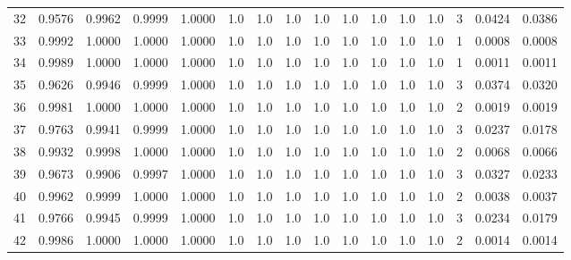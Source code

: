 \begin{tabular}{lrrrrrrrrrrrrrrr}
32  &      0.9576 &  0.9962 &  0.9999 &  1.0000 &     1.0 &     1.0 &     1.0 &     1.0 &     1.0 &     1.0 &      1.0 &        1.0 &      3 &                    0.0424 &                     0.0386 \\
33  &      0.9992 &  1.0000 &  1.0000 &  1.0000 &     1.0 &     1.0 &     1.0 &     1.0 &     1.0 &     1.0 &      1.0 &        1.0 &      1 &                    0.0008 &                     0.0008 \\
34  &      0.9989 &  1.0000 &  1.0000 &  1.0000 &     1.0 &     1.0 &     1.0 &     1.0 &     1.0 &     1.0 &      1.0 &        1.0 &      1 &                    0.0011 &                     0.0011 \\
35  &      0.9626 &  0.9946 &  0.9999 &  1.0000 &     1.0 &     1.0 &     1.0 &     1.0 &     1.0 &     1.0 &      1.0 &        1.0 &      3 &                    0.0374 &                     0.0320 \\
36  &      0.9981 &  1.0000 &  1.0000 &  1.0000 &     1.0 &     1.0 &     1.0 &     1.0 &     1.0 &     1.0 &      1.0 &        1.0 &      2 &                    0.0019 &                     0.0019 \\
37  &      0.9763 &  0.9941 &  0.9999 &  1.0000 &     1.0 &     1.0 &     1.0 &     1.0 &     1.0 &     1.0 &      1.0 &        1.0 &      3 &                    0.0237 &                     0.0178 \\
38  &      0.9932 &  0.9998 &  1.0000 &  1.0000 &     1.0 &     1.0 &     1.0 &     1.0 &     1.0 &     1.0 &      1.0 &        1.0 &      2 &                    0.0068 &                     0.0066 \\
39  &      0.9673 &  0.9906 &  0.9997 &  1.0000 &     1.0 &     1.0 &     1.0 &     1.0 &     1.0 &     1.0 &      1.0 &        1.0 &      3 &                    0.0327 &                     0.0233 \\
40  &      0.9962 &  0.9999 &  1.0000 &  1.0000 &     1.0 &     1.0 &     1.0 &     1.0 &     1.0 &     1.0 &      1.0 &        1.0 &      2 &                    0.0038 &                     0.0037 \\
41  &      0.9766 &  0.9945 &  0.9999 &  1.0000 &     1.0 &     1.0 &     1.0 &     1.0 &     1.0 &     1.0 &      1.0 &        1.0 &      3 &                    0.0234 &                     0.0179 \\
42  &      0.9986 &  1.0000 &  1.0000 &  1.0000 &     1.0 &     1.0 &     1.0 &     1.0 &     1.0 &     1.0 &      1.0 &        1.0 &      2 &                    0.0014 &                     0.0014 \\

\end{tabular}
